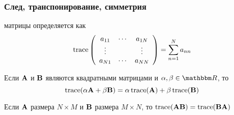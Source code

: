 \begin{frame}\frametitle{След, транспонирование, симметрия}
    
     матрицы определяется как 
    \vspace{0.5em}
    \begin{equation*}
        \operatorname{trace} \left(
        \begin{array}{ccc}
            a_{11} &  \cdots & a_{1N} \\
            \vdots & &  \vdots \\
            a_{N1} &  \cdots & a_{NN} \\
        \end{array}
        \right)
        = 
        \sum_{n=1}^N a_{nn}
    \end{equation*}

    \vspace{0.5em}

    \vspace{0.5em}

    \Fact{\eqref{ET-fa:lmpt}} Если $\mathbf A$ и $\mathbf B$ являются квадратными матрицами и
    $\alpha, \beta \in \RR$, то 
    \begin{equation*}
        \operatorname{trace}(\alpha \mathbf A + \beta \mathbf B) 
        = \alpha \operatorname{trace}(\mathbf A) + \beta \operatorname{trace}(\mathbf B)
    \end{equation*}

    \vspace{0.5em}
    Если 
    $\mathbf A$ размера $N \times M$ и $\mathbf B$ размера $M \times N$, то 
    $\operatorname{trace}(\mathbf A \mathbf B) = \operatorname{trace}(\mathbf B \mathbf A)$

\end{frame}

